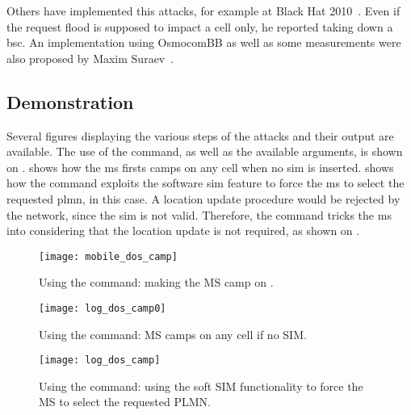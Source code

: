       Others have implemented this attacks, for example 
      at Black Hat 2010~\cite{the_grugq_base_2010}. Even if the request
      flood is supposed to impact a cell only, he reported taking down a
      \gls{bsc}. An implementation using OsmocomBB as well as some
      measurements were also proposed by Maxim
      Suraev~\cite{suraev_denial--service_2011}.

      \iffalse
need to show example of use and output
maybe in appendices
\fi

      \subsection{Demonstration}
      \label{sec:rachell_demo}
      
      Several figures displaying the various steps of the attacks and
      their output are available. The use of the 
      command, as well as the available arguments, is shown on
      .  shows how the
      \gls{ms} firsts camps on any cell when no \gls{sim} is inserted.
       shows how the  command
      exploits the software \gls{sim} feature to force the \gls{ms} to
      select the requested \gls{plmn},  in this case. A
      location update procedure would be rejected by the network, since
      the \gls{sim} is not valid. Therefore, the  command
      tricks the \gls{ms} into considering that the location update is
      not required, as shown on .

      \begin{figure}
        \centering
        \texttt{[image: mobile\_dos\_camp]}
        \caption{Using the  command: making the MS camp on
        .}
        \label{fig:mobile_dos_camp}
      \end{figure}

      \begin{figure}
        \centering
        \texttt{[image: log\_dos\_camp0]}
        \caption{Using the  command: MS camps on any cell
        if no SIM.}
        \label{fig:log_dos_camp0}
      \end{figure}
     
      \begin{figure}
        \centering
        \texttt{[image: log\_dos\_camp]}
        \caption{Using the  command: using the soft SIM
        functionality to force the MS to select the requested PLMN.}
        \label{fig:log_dos_camp}
      \end{figure}

